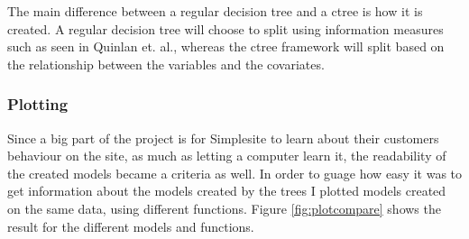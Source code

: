 The main difference between a regular decision tree and a ctree is how it is
created. A regular decision tree will choose to split using information measures
such as seen in Quinlan et. al.\cite[p. 89]{quinlan1986induction}, whereas the
ctree framework will split based on the relationship between the variables and
the covariates. 


\subsubsection{Plotting}
\label{sec:treetypeplot}

Since a big part of the project is for Simplesite to learn about their customers
behaviour on the site, as much as letting a computer learn it, the readability
of the created models became a criteria as well. In order to guage how easy it
was to get information about the models created by the trees I plotted models
created on the same data, using different functions. Figure
\ref{fig:plotcompare} shows the result for the different models and functions.

